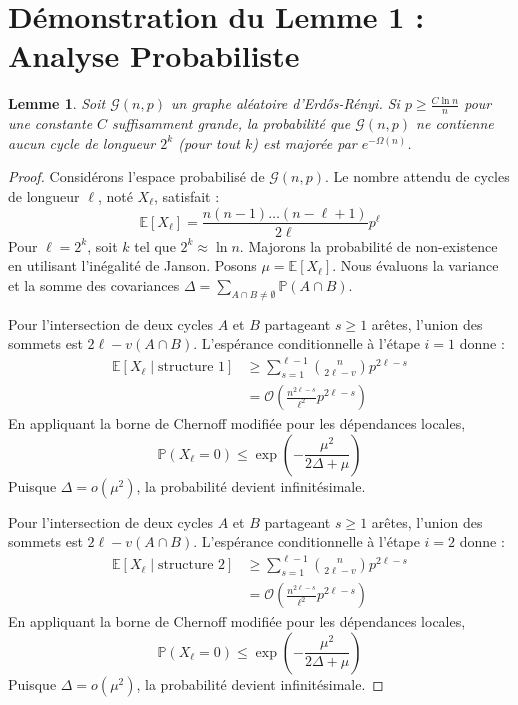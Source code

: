 \documentclass[11pt,a4paper]{article}
\newtheorem{lemma}[theorem]{Lemme}
\theoremstyle{definition}
\begin{document}
\section{Démonstration du Lemme 1 : Analyse Probabiliste}
\begin{lemma}
Soit $\mathcal{G}(n, p)$ un graphe aléatoire d'Erd\H{o}s-R\'enyi. Si $p \ge \frac{C \ln n}{n}$ pour une constante $C$ suffisamment grande, la probabilité que $\mathcal{G}(n, p)$ ne contienne aucun cycle de longueur $2^k$ (pour tout $k$) est majorée par $e^{-\Omega(n)}$.
\end{lemma}
\begin{proof}
Considérons l'espace probabilisé de $\mathcal{G}(n, p)$. Le nombre attendu de cycles de longueur $\ell$, noté $X_\ell$, satisfait :
\begin{equation}
\mathbb{E}[X_\ell] = \frac{n(n-1)\dots(n-\ell+1)}{2\ell} p^\ell
\end{equation}
Pour $\ell = 2^k$, soit $k$ tel que $2^k \approx \ln n$.
Majorons la probabilité de non-existence en utilisant l'inégalité de Janson.
Posons $\mu = \mathbb{E}[X_\ell]$. Nous évaluons la variance et la somme des covariances $\Delta = \sum_{A \cap B \neq \emptyset} \mathbb{P}(A \cap B)$.

Pour l'intersection de deux cycles $A$ et $B$ partageant $s \ge 1$ arêtes, l'union des sommets est $2\ell - v(A \cap B)$.
L'espérance conditionnelle à l'étape $i=1$ donne :
\begin{align*}
\mathbb{E}[X_\ell \mid \text{structure } 1] &\ge \sum_{s=1}^{\ell-1} \binom{n}{2\ell - v} p^{2\ell - s} \\
&= \mathcal{O}\left( \frac{n^{2\ell - s}}{\ell^2} p^{2\ell - s} \right)
\end{align*}
En appliquant la borne de Chernoff modifiée pour les dépendances locales,
\begin{equation}
\mathbb{P}(X_\ell = 0) \le \exp\left(-\frac{\mu^2}{2\Delta + \mu}\right)
\end{equation}
Puisque $\Delta = o(\mu^2)$, la probabilité devient infinitésimale.

Pour l'intersection de deux cycles $A$ et $B$ partageant $s \ge 1$ arêtes, l'union des sommets est $2\ell - v(A \cap B)$.
L'espérance conditionnelle à l'étape $i=2$ donne :
\begin{align*}
\mathbb{E}[X_\ell \mid \text{structure } 2] &\ge \sum_{s=1}^{\ell-1} \binom{n}{2\ell - v} p^{2\ell - s} \\
&= \mathcal{O}\left( \frac{n^{2\ell - s}}{\ell^2} p^{2\ell - s} \right)
\end{align*}
En appliquant la borne de Chernoff modifiée pour les dépendances locales,
\begin{equation}
\mathbb{P}(X_\ell = 0) \le \exp\left(-\frac{\mu^2}{2\Delta + \mu}\right)
\end{equation}
Puisque $\Delta = o(\mu^2)$, la probabilité devient infinitésimale.


\end{proof}
\end{document}
